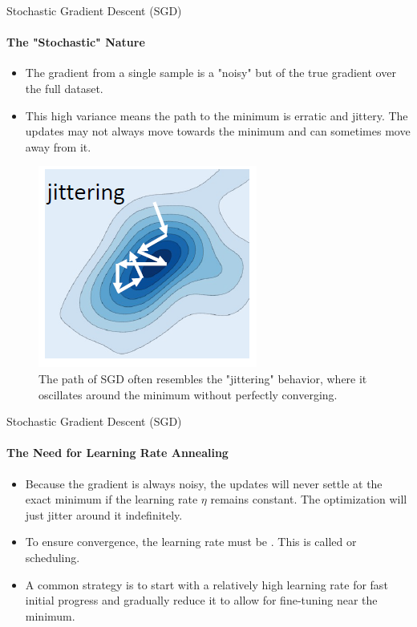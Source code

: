 \begin{frame}{Stochastic Gradient Descent (SGD)}
    \framesubtitle{The "Stochastic" Nature}
    \begin{itemize}
        \item The gradient from a single sample is a "noisy" but  of the true gradient over the full dataset.
        \item This high variance means the path to the minimum is erratic and jittery. The updates may not always move towards the minimum and can sometimes move away from it.
    \end{itemize}
    \begin{figure}
        \centering
        \includegraphics[width=0.2\linewidth]{images/convergence_behaviors.png}
        \caption{The path of SGD often resembles the "jittering" behavior, where it oscillates around the minimum without perfectly converging.}
    \end{figure}
\end{frame}

\begin{frame}{Stochastic Gradient Descent (SGD)}
    \framesubtitle{The Need for Learning Rate Annealing}
    \begin{itemize}
        \item Because the gradient is always noisy, the updates will never settle at the exact minimum if the learning rate $\eta$ remains constant. The optimization will just jitter around it indefinitely.
        \item To ensure convergence, the learning rate must be . This is called  or scheduling.
        \item A common strategy is to start with a relatively high learning rate for fast initial progress and gradually reduce it to allow for fine-tuning near the minimum.
    \end{itemize}
\end{frame}

